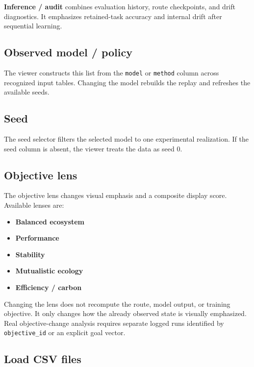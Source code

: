 \documentclass[11pt,a4paper]{article}
\newcommand{\ui}[1]{\textsf{\bfseries #1}}
\newcommand{\code}[1]{\texttt{#1}}
\begin{document}
\ui{Inference / audit} combines evaluation history, route checkpoints, and drift diagnostics. It emphasizes retained-task accuracy and internal drift after sequential learning.

\subsection{Observed model / policy}

The viewer constructs this list from the \code{model} or \code{method} column across recognized input tables. Changing the model rebuilds the replay and refreshes the available seeds.

\subsection{Seed}

The seed selector filters the selected model to one experimental realization. If the seed column is absent, the viewer treats the data as seed 0.

\subsection{Objective lens}

The objective lens changes visual emphasis and a composite display score. Available lenses are:

\begin{itemize}
  \item \ui{Balanced ecosystem}
  \item \ui{Performance}
  \item \ui{Stability}
  \item \ui{Mutualistic ecology}
  \item \ui{Efficiency / carbon}
\end{itemize}

\begin{warningbox}
Changing the lens does not recompute the route, model output, or training objective. It only changes how the already observed state is visually emphasized. Real objective-change analysis requires separate logged runs identified by \code{objective\_id} or an explicit goal vector.
\end{warningbox}

\subsection{Load CSV files}
\end{document}

